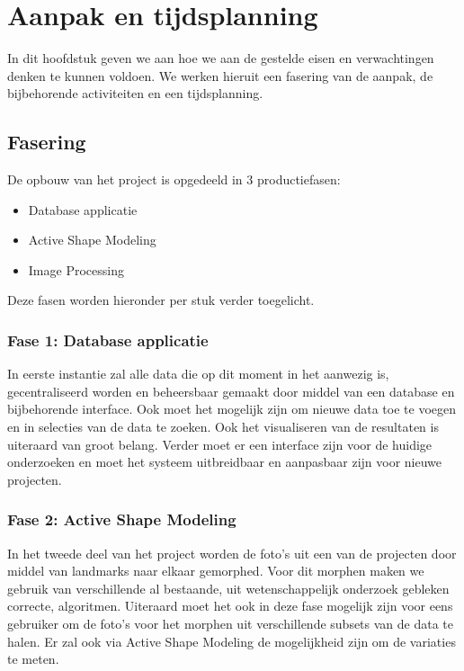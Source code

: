\section{Aanpak en tijdsplanning}
\label{aanpak_en_tijdsplanning}

In dit hoofdstuk geven we aan hoe we aan de gestelde eisen en verwachtingen denken te kunnen voldoen. 
We werken hieruit een fasering van de aanpak, de bijbehorende activiteiten en een tijdsplanning.

\subsection{Fasering}

De opbouw van het project is opgedeeld in 3 productiefasen:
\begin{itemize}
	\item Database applicatie
	\item Active Shape Modeling
	\item Image Processing
\end{itemize}
Deze fasen worden hieronder per stuk verder toegelicht.

\subsubsection{Fase 1: Database applicatie}
In eerste instantie zal alle data die op dit moment in het \casamproject aanwezig is, gecentraliseerd worden en beheersbaar gemaakt door middel van een database en bijbehorende interface. 
Ook moet het mogelijk zijn om nieuwe data toe te voegen en in selecties van de data te zoeken. 
Ook het visualiseren van de resultaten is uiteraard van groot belang. 
Verder moet er een interface zijn voor de huidige onderzoeken en moet het systeem uitbreidbaar en aanpasbaar zijn voor nieuwe projecten.

\subsubsection{Fase 2: Active Shape Modeling}
In het tweede deel van het project worden de foto's uit een van de projecten door middel van landmarks naar elkaar gemorphed. 
Voor dit morphen maken we gebruik van verschillende al bestaande, uit wetenschappelijk onderzoek gebleken correcte, algoritmen.
Uiteraard moet het ook in deze fase mogelijk zijn voor eens gebruiker om de foto's voor het morphen uit verschillende subsets van de data te halen.
Er zal ook via Active Shape Modeling de mogelijkheid zijn om de variaties te meten.

